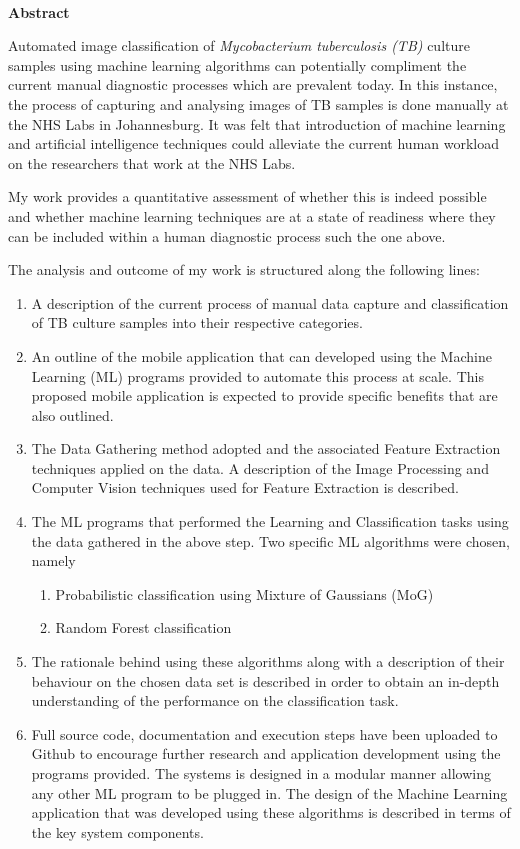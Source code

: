 \documentclass[a4paper,twoside,12pt]{report}
\renewenvironment{abstract}{\ \vfill\begin{center}\textbf{Abstract}\end{center}\addcontentsline{toc}{section}{Abstract}}{\vfill\vfill\newpage}
\begin{document}
\begin{abstract}
\small
Automated image classification of {\itshape Mycobacterium tuberculosis (TB) } culture samples using machine learning algorithms can potentially compliment the current manual diagnostic processes which are prevalent today.    In this instance, the process of capturing and analysing images of TB samples is done manually at the NHS Labs in Johannesburg.      It was felt that introduction of machine learning and artificial intelligence techniques could alleviate the current human workload on the researchers that work at the NHS Labs.

My work provides a quantitative assessment of whether this is indeed possible and whether machine learning techniques are at a state of readiness where they can be included within a human diagnostic process such the one above.

The analysis and outcome of my work is structured along the following lines: 
\begin{enumerate}
\item A description of the current process of manual data capture and classification of TB culture samples into their respective categories. 
\item An outline of the mobile application that can developed using the Machine Learning (ML) programs provided to automate this process at scale.  This proposed mobile application is expected to provide specific benefits that are also outlined. 
\item The Data Gathering method adopted and the associated Feature Extraction techniques applied on the data.     A description of the Image Processing and Computer Vision techniques used for Feature Extraction is described. 
\item The ML programs that performed the Learning and Classification tasks using the data gathered in the above step.   Two specific ML algorithms were chosen, namely
\begin{enumerate}
\item Probabilistic classification using Mixture of Gaussians (MoG) 
\item Random Forest classification 
\end{enumerate}
\item The rationale behind using these algorithms along with a description of their behaviour on the chosen data set is described in order to obtain an in-depth understanding of the performance on the classification task. 
\item 
Full source code, documentation and execution steps have been uploaded to Github to encourage further research and application development using the programs provided.   The systems is designed in a modular manner allowing any other ML program to be plugged in. 
The design of the Machine Learning application that was developed using these algorithms is described in terms of the key system components.     


\end{enumerate}
\end{abstract}
\end{document}
